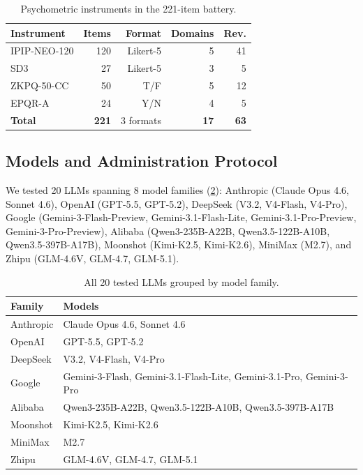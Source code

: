 \documentclass[11pt]{article}
\begin{document}
\begin{table}[t]
\centering
\small
\caption{Psychometric instruments in the 221-item battery.}
\label{tab:instruments}
\begin{tabular}{lrrrr}
\toprule
Instrument & Items & Format & Domains & Rev. \\
\midrule
IPIP-NEO-120 & 120 & Likert-5 & 5 & 41 \\
SD3 & 27 & Likert-5 & 3 & 5 \\
ZKPQ-50-CC & 50 & T/F & 5 & 12 \\
EPQR-A & 24 & Y/N & 4 & 5 \\
\midrule
\textbf{Total} & \textbf{221} & 3 formats & \textbf{17} & \textbf{63} \\
\bottomrule
\end{tabular}
\end{table}

\subsection{Models and Administration Protocol}

We tested 20 LLMs spanning 8 model families (\cref{tab:models}): Anthropic (Claude Opus 4.6, Sonnet 4.6), OpenAI (GPT-5.5, GPT-5.2), DeepSeek (V3.2, V4-Flash, V4-Pro), Google (Gemini-3-Flash-Preview, Gemini-3.1-Flash-Lite, Gemini-3.1-Pro-Preview, Gemini-3-Pro-Preview), Alibaba (Qwen3-235B-A22B, Qwen3.5-122B-A10B, Qwen3.5-397B-A17B), Moonshot (Kimi-K2.5, Kimi-K2.6), MiniMax (M2.7), and Zhipu (GLM-4.6V, GLM-4.7, GLM-5.1).

\begin{table}[t]
\centering
\small
\caption{All 20 tested LLMs grouped by model family.}
\label{tab:models}
\begin{tabular}{l>{\centering\arraybackslash}p{5.2cm}}
\toprule
Family & Models \\
\midrule
Anthropic & Claude Opus 4.6, Sonnet 4.6 \\
OpenAI & GPT-5.5, GPT-5.2 \\
DeepSeek & V3.2, V4-Flash, V4-Pro \\
Google & Gemini-3-Flash, Gemini-3.1-Flash-Lite, Gemini-3.1-Pro, Gemini-3-Pro \\
Alibaba & Qwen3-235B-A22B, Qwen3.5-122B-A10B, Qwen3.5-397B-A17B \\
Moonshot & Kimi-K2.5, Kimi-K2.6 \\
MiniMax & M2.7 \\
Zhipu & GLM-4.6V, GLM-4.7, GLM-5.1 \\
\bottomrule
\end{tabular}
\end{table}
\end{document}
